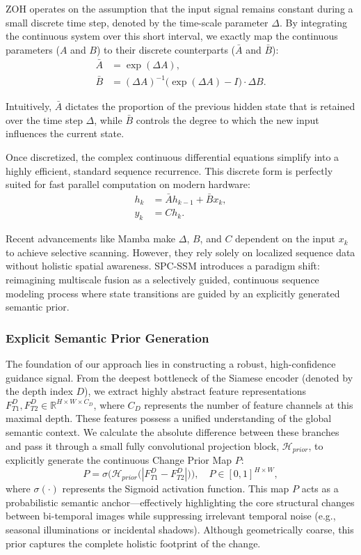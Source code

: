 \documentclass[10pt,conference]{IEEEtran}
\begin{document}
ZOH operates on the assumption that the input signal remains constant during a small discrete time step, denoted by the time-scale parameter $\Delta$. By integrating the continuous system over this short interval, we exactly map the continuous parameters ($A$ and $B$) to their discrete counterparts ($\bar{A}$ and $\bar{B}$):
\begin{align}
    \bar{A} &= \exp(\Delta A), \\
    \bar{B} &= (\Delta A)^{-1}\big(\exp(\Delta A) - I\big) \cdot \Delta B.
\end{align}

Intuitively, $\bar{A}$ dictates the proportion of the previous hidden state that is retained over the time step $\Delta$, while $\bar{B}$ controls the degree to which the new input influences the current state. 

Once discretized, the complex continuous differential equations simplify into a highly efficient, standard sequence recurrence. This discrete form is perfectly suited for fast parallel computation on modern hardware:
\begin{align}
    h_k &= \bar{A} h_{k-1} + \bar{B} x_k, \\
    y_k &= C h_k.
\end{align}

Recent advancements like Mamba make $\Delta$, $B$, and $C$ dependent on the input $x_k$ to achieve selective scanning. However, they rely solely on localized sequence data without holistic spatial awareness. SPC-SSM introduces a paradigm shift: reimagining multiscale fusion as a selectively guided, continuous sequence modeling process where state transitions are guided by an explicitly generated semantic prior.

\subsubsection{Explicit Semantic Prior Generation}
The foundation of our approach lies in constructing a robust, high-confidence guidance signal. From the deepest bottleneck of the Siamese encoder (denoted by the depth index $D$), we extract highly abstract feature representations $F_{T1}^D, F_{T2}^D \in \mathbb{R}^{H \times W \times C_D}$, where $C_D$ represents the number of feature channels at this maximal depth. These features possess a unified understanding of the global semantic context. We calculate the absolute difference between these branches and pass it through a small fully convolutional projection block, $\mathcal{H}_{prior}$, to explicitly generate the continuous Change Prior Map $P$:
\begin{equation}
    P = \sigma\Big( \mathcal{H}_{prior} \big( |F_{T1}^D - F_{T2}^D| \big) \Big), \quad P \in [0, 1]^{H \times W},
\end{equation}
where $\sigma(\cdot)$ represents the Sigmoid activation function. This map $P$ acts as a probabilistic semantic anchor—effectively highlighting the core structural changes between bi-temporal images while suppressing irrelevant temporal noise (e.g., seasonal illuminations or incidental shadows). Although geometrically coarse, this prior captures the complete holistic footprint of the change.
\end{document}
